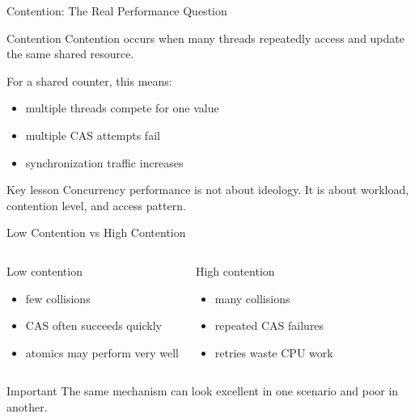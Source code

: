 \documentclass[aspectratio=169,11pt]{beamer}
\begin{document}
	\begin{frame}{Contention: The Real Performance Question}
		\begin{block}{Contention}
			Contention occurs when many threads repeatedly access and update the same shared resource.
		\end{block}
		
		\vspace{0.35cm}
		
		For a shared counter, this means:
		\begin{itemize}
			\item multiple threads compete for one value
			\item multiple CAS attempts fail
			\item synchronization traffic increases
		\end{itemize}
		
		\vspace{0.35cm}
		
		\begin{exampleblock}{Key lesson}
			Concurrency performance is not about ideology.  
			It is about workload, contention level, and access pattern.
		\end{exampleblock}
	\end{frame}
	
	\begin{frame}{Low Contention vs High Contention}
		\begin{columns}[T]
			\begin{block}{Low contention}
				\begin{itemize}
					\item few collisions
					\item CAS often succeeds quickly
					\item atomics may perform very well
				\end{itemize}
			\end{block}
			
			\begin{block}{High contention}
				\begin{itemize}
					\item many collisions
					\item repeated CAS failures
					\item retries waste CPU work
				\end{itemize}
			\end{block}
		\end{columns}
		
		\vspace{0.35cm}
		
		\begin{alertblock}{Important}
			The same mechanism can look excellent in one scenario and poor in another.
		\end{alertblock}
	\end{frame}
	
\end{document}
